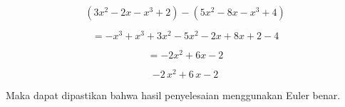 \documentclass[a4paper,10pt]{article}
\begin{document}
\begin{eulernotebook}
\begin{eulercomment}
\begin{eulercomment}
\begin{eulercomment}
\begin{eulercomment}
\begin{eulercomment}
\begin{eulercomment}
\begin{eulercomment}
\begin{eulercomment}
\begin{eulercomment}
\begin{eulercomment}
\begin{eulercomment}
\begin{eulercomment}
\begin{eulercomment}
\end{eulercomment}
\begin{eulercomment}
\end{eulercomment}
\begin{eulerformula}
\[
(3x^2 - 2x - x^3 + 2) - (5x^2 - 8x - x^3 + 4)
\]
\end{eulerformula}
\begin{eulercomment}
\end{eulercomment}
\begin{eulerformula}
\[
= - x^3 + x^3 + 3x^2 - 5x^2 - 2x + 8x + 2 - 4
\]
\end{eulerformula}
\begin{eulercomment}
\end{eulercomment}
\begin{eulerformula}
\[
= - 2x^2 + 6x -2
\]
\end{eulerformula}
\begin{eulerformula}
\[
-2\,x^2+6\,x-2
\]
\end{eulerformula}
\begin{eulercomment}
Maka dapat dipastikan bahwa hasil penyelesaian menggunakan Euler
benar.
\end{eulercomment}
\begin{eulercomment}



\end{eulercomment}
\end{eulercomment}
\end{eulercomment}
\end{eulercomment}
\end{eulercomment}
\end{eulercomment}
\end{eulercomment}
\end{eulercomment}
\end{eulercomment}
\end{eulercomment}
\end{eulercomment}
\end{eulercomment}
\end{eulercomment}
\end{eulernotebook}
\end{document}
